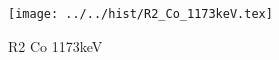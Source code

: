 \begin{figure}[h] \centering\texttt{[image: ../../hist/R2\_Co\_1173keV.tex]}\caption{R2 Co 1173keV}\label{hist:R2_Co_1173keV} \end{figure}
